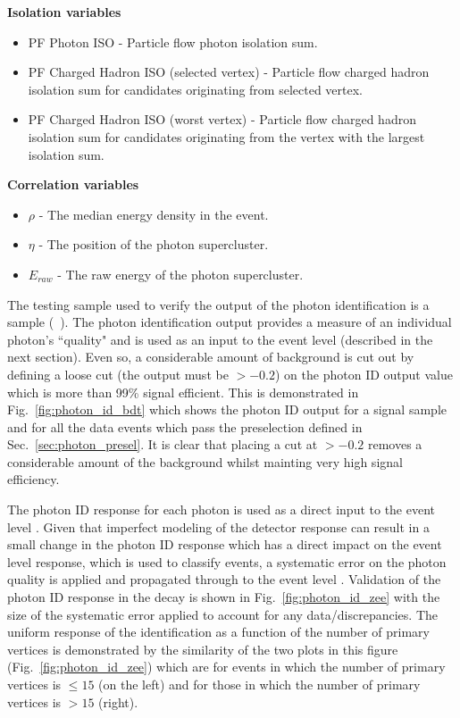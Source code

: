 \noindent\textbf{Isolation variables}
\begin{itemize}
  \item PF Photon ISO - Particle flow photon isolation sum.
  \item PF Charged Hadron ISO (selected vertex) - Particle flow charged hadron isolation sum for candidates originating from selected vertex.
  \item PF Charged Hadron ISO (worst vertex) - Particle flow charged hadron isolation sum for candidates originating from the vertex with the largest isolation sum.
\end{itemize}

\noindent\textbf{Correlation variables}
\begin{itemize}
  \item $\rho$ - The median energy density in the event.
  \item $\eta$ - The \eta position of the photon supercluster.
  \item $E_{raw}$ - The raw energy of the photon supercluster.
\end{itemize}

The testing sample used to verify the output of the photon identification \BDT is a \MC \Hgg sample (~\GeV). The photon identification \BDT output provides a measure of an individual photon's ``quality" and is used as an input to the event level \BDT (described in the next section). Even so, a considerable amount of background is cut out by defining a loose cut (the \BDT output must be $>-0.2$) on the photon ID \BDT output value which is more than 99\% signal efficient. This is demonstrated in Fig.~\ref{fig:photon_id_bdt} which shows the photon ID \BDT output for a \Hgg signal \MC sample and for all the data events which pass the preselection defined in Sec.~\ref{sec:photon_presel}. It is clear that placing a cut at $>-0.2$ removes a considerable amount of the background whilst mainting very high signal efficiency. 

The photon ID \BDT response for each photon is used as a direct input to the event level \MVA. Given that imperfect modeling of the detector response can result in a small change in the photon ID response which has a direct impact on the event level \MVA response, which is used to classify events, a systematic error on the photon quality is applied and propagated through to the event level \MVA. Validation of the photon ID \BDT response in the \Zee decay is shown in Fig.~\ref{fig:photon_id_zee} with the size of the systematic error applied to account for any data/\MC discrepancies. The uniform response of the identification as a function of the number of primary vertices is demonstrated by the similarity of the two plots in this figure (Fig.~\ref{fig:photon_id_zee}) which are for events in which the number of primary vertices is $\leq 15$ (on the left) and for those in which the number of primary vertices is $>15$ (right).

